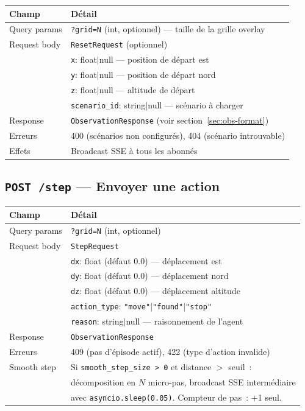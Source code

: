 \documentclass[a4paper, 11pt, french]{article}
\newcommand{\code}[1]{\texttt{#1}}
\newcommand{\apiendpoint}[2]{\texorpdfstring{\texttt{#1}~\texttt{#2}}{#1 #2}}
\begin{document}
\begin{table}[H]
\centering\small
\begin{tabular}{lp{10cm}}
\toprule
\textbf{Champ} & \textbf{Détail} \\
\midrule
Query params & \code{?grid=N} (int, optionnel) --- taille de la grille overlay \\
\midrule
Request body & \code{ResetRequest} (optionnel) \\
& \code{x}: float$|$null --- position de départ est \\
& \code{y}: float$|$null --- position de départ nord \\
& \code{z}: float$|$null --- altitude de départ \\
& \code{scenario\_id}: string$|$null --- scénario à charger \\
\midrule
Response & \code{ObservationResponse} (voir section~\ref{sec:obs-format}) \\
Erreurs & 400 (scénarios non configurés), 404 (scénario introuvable) \\
Effets & Broadcast SSE à tous les abonnés \\
\bottomrule
\end{tabular}
\end{table}

\subsection{\apiendpoint{POST}{/step} --- Envoyer une action}

\begin{table}[H]
\centering\small
\begin{tabular}{lp{10cm}}
\toprule
\textbf{Champ} & \textbf{Détail} \\
\midrule
Query params & \code{?grid=N} (int, optionnel) \\
\midrule
Request body & \code{StepRequest} \\
& \code{dx}: float (défaut 0.0) --- déplacement est \\
& \code{dy}: float (défaut 0.0) --- déplacement nord \\
& \code{dz}: float (défaut 0.0) --- déplacement altitude \\
& \code{action\_type}: \code{"move"}$|$\code{"found"}$|$\code{"stop"} \\
& \code{reason}: string$|$null --- raisonnement de l'agent \\
\midrule
Response & \code{ObservationResponse} \\
Erreurs & 409 (pas d'épisode actif), 422 (type d'action invalide) \\
\midrule
Smooth step & Si \code{smooth\_step\_size > 0} et distance $>$ seuil~:\\
& décomposition en $N$ micro-pas, broadcast SSE intermédiaire\\
& avec \code{asyncio.sleep(0.05)}.  Compteur de pas~: +1 seul.\\
\bottomrule
\end{tabular}
\end{table}
\end{document}
